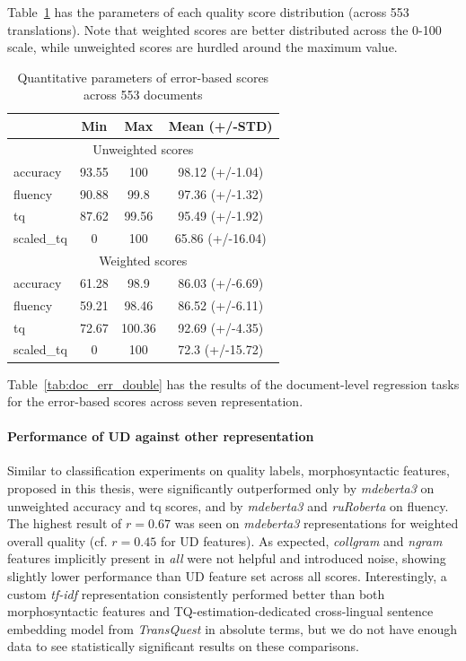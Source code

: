 Table~\ref{tab:docs_err_par} has the parameters of each quality score distribution (across 553 translations). Note that weighted scores are better distributed across the 0-100 scale, while unweighted scores are hurdled around the maximum value.
\begin{table}[H]
	\centering
	\begin{tabular}{l|ccc}
		\toprule
		& Min   & Max    & Mean (+/-STD)  \\
		\midrule
		\multicolumn{4}{c}{Unweighted scores} \\
		\midrule
		accuracy   & 93.55 & 100    & 98.12 (+/-1.04)  \\
		fluency    & 90.88 & 99.8   & 97.36 (+/-1.32)  \\
		tq         & 87.62 & 99.56  & 95.49 (+/-1.92)  \\
		scaled\_tq & 0     & 100    & 65.86 (+/-16.04) \\
		\midrule
		\multicolumn{4}{c}{Weighted scores} \\
		\midrule
		accuracy   & 61.28 & 98.9   & 86.03 (+/-6.69)  \\
		fluency    & 59.21 & 98.46  & 86.52 (+/-6.11)  \\
		tq         & 72.67 & 100.36 & 92.69 (+/-4.35)  \\
		scaled\_tq & 0     & 100    & 72.3  (+/-15.72) \\
		\bottomrule
	\end{tabular}
	\caption{\label{tab:docs_err_par}Quantitative parameters of error-based scores across 553 documents}
\end{table}

Table~\ref{tab:doc_err_double} has the results of the document-level regression tasks for the error-based scores across seven representation.
\paragraph{\label{pg:doc_err_ud_vs_all}Performance of UD against other representation}
Similar to classification experiments on quality labels, morphosyntactic features, proposed in this thesis, were significantly outperformed only by \textit{mdeberta3} on unweighted accuracy and tq scores, and by \textit{mdeberta3} and \textit{ruRoberta} on fluency.
The highest result of $r=0.67$ was seen on \textit{mdeberta3} representations for weighted overall quality (cf. $r=0.45$ for UD features). %
As expected, \textit{collgram} and \textit{ngram} features implicitly present in \textit{all} were not helpful and introduced noise, showing slightly lower performance than UD feature set across all scores. 
Interestingly, a custom \textit{tf-idf} representation consistently performed better than both morphosyntactic features and TQ-estimation-dedicated cross-lingual sentence embedding model from \textit{TransQuest} in absolute terms, but we do not have enough data to see statistically significant results on these comparisons.


